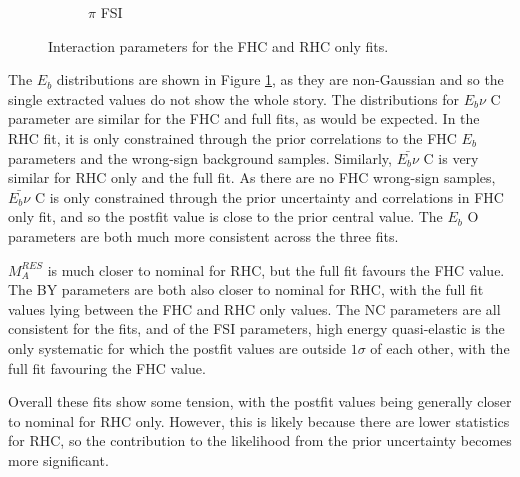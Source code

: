 \begin{figure}
\begin{subfigure}{0.49\textwidth}
  \caption{$\pi$ FSI}
\end{subfigure}
\caption{Interaction parameters for the FHC and RHC only fits.}
\label{fig:fhcrhcxsec}
\end{figure}

The $E_b$ distributions are shown in Figure \ref{fig:fhcrhcxsec}, as they are non-Gaussian and so the single extracted values do not show the whole story. The distributions for $E_b \nu$ C parameter are similar for the FHC and full fits, as would be expected. In the RHC fit, it is only constrained through the prior correlations to the FHC $E_b$ parameters and the wrong-sign background samples. Similarly, $\bar{E_b \nu}$ C is very similar for RHC only and the full fit. As there are no FHC wrong-sign samples, $\bar{E_b \nu}$ C is only constrained through the prior uncertainty and correlations in FHC only fit, and so the postfit value is close to the prior central value. The $E_b$ O parameters are both much more consistent across the three fits.

$M_{A}^{RES}$ is much closer to nominal for RHC, but the full fit favours the FHC value. The BY parameters are both also closer to nominal for RHC, with the full fit values lying between the FHC and RHC only values. The NC parameters are all consistent for the fits, and of the FSI parameters, high energy quasi-elastic is the only systematic for which the postfit values are outside $1\sigma$ of each other, with the full fit favouring the FHC value.

Overall these fits show some tension, with the postfit values being generally closer to nominal for RHC only. However, this is likely because there are lower statistics for RHC, so the contribution to the likelihood from the prior uncertainty becomes more significant.

